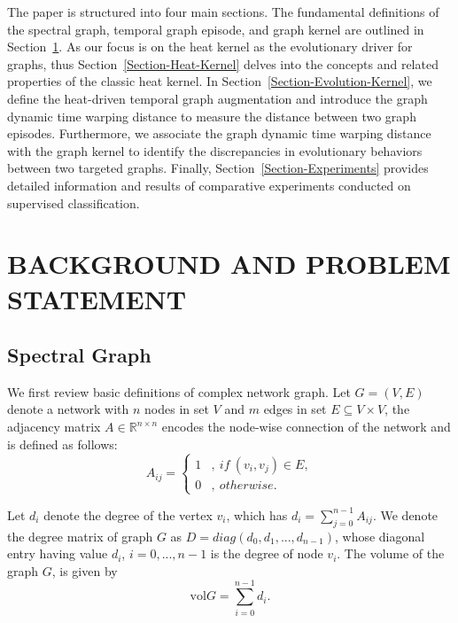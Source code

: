 \documentclass[10pt,journal,compsoc]{IEEEtran}
\begin{document}
The paper is structured into four main sections. The fundamental definitions of the spectral graph, temporal graph episode, and graph kernel are outlined in Section~\ref{Section-Problem-BACKGROUND-AND-PROBLEM-STATEMENT}. As our focus is on the heat kernel as the evolutionary driver for graphs, thus Section~\ref{Section-Heat-Kernel} delves into the concepts and related properties of the classic heat kernel. In Section~\ref{Section-Evolution-Kernel}, we define the heat-driven temporal graph augmentation and introduce the graph dynamic time warping distance to measure the distance between two graph episodes. Furthermore, we associate the graph dynamic time warping distance with the graph kernel to identify the discrepancies in evolutionary behaviors between two targeted graphs. Finally, Section~\ref{Section-Experiments} provides detailed information and results of comparative experiments conducted on supervised classification.


\newtheorem{definition}{Definition}
\newtheorem{theorem}{Theorem}
\newtheorem{lemma}{Lemma}
\section{BACKGROUND AND PROBLEM STATEMENT}\label{Section-Problem-BACKGROUND-AND-PROBLEM-STATEMENT}
\subsection{Spectral Graph}
We first review basic definitions of complex network graph. Let $G = (V, E)$ denote a network with $n$ nodes in set $V$ and $m$ edges in set $E \subseteq V\times V$, the adjacency matrix $A \in \mathbb{R}^{n \times n}$ encodes the node-wise connection of the network and is defined as follows:
\begin{equation}
     A_{ij}=\left\{
     \begin{aligned}
      1                 &,  \ if \ (v_{i}, v_{j}) \in E, \\
      0                 &,  \ otherwise.
      \end{aligned}
      \right.
\end{equation}


Let $d_{i}$ denote the degree of the vertex $v_{i}$, which has $d_{i}=\sum\nolimits_{j=0}^{n-1}A_{ij}$. We denote the degree matrix of graph $G$ as $D = diag(d_0, d_1, ..., d_{n-1})$, whose diagonal entry having value $d_{i}$, $i = 0 , ..., n-1$ is the degree of node $v_{i}$. The volume of the graph $G$, is given by
\begin{equation}
     \textrm{vol} G = \sum\limits_{i = 0}^{n-1} d_{i}.
\end{equation}
\end{document}
